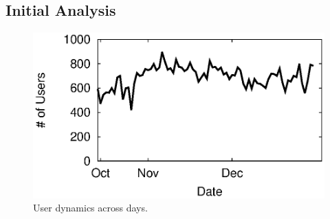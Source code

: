 \subsection{Initial Analysis}
\begin{figure}[t]
\begin{minipage}{0.32\textwidth}
 \centering
	\includegraphics[width=1\textwidth]{plots/basic/dynamic_by_day.eps}
	\caption{User dynamics across days.}
	\label{fig:user_dynamic_day}
\end{minipage}
\end{figure}

